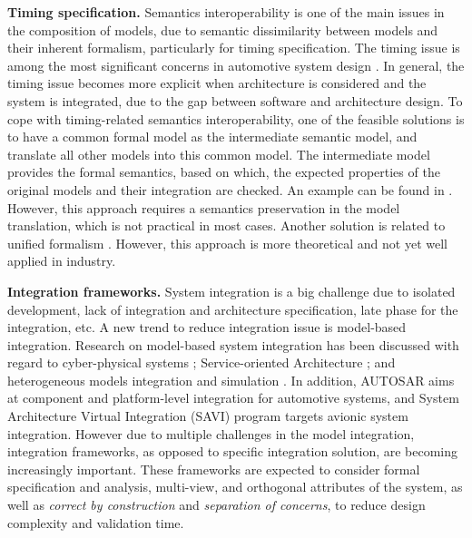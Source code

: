 \vspace{0.6em}
\textbf{Timing specification.}
Semantics interoperability is one of the main issues in the composition of models, due to semantic dissimilarity between models and their inherent formalism, particularly for timing specification. The timing issue is among the most significant concerns in automotive system design \cite{broy06, yu:2013-jsa}. In general, the timing issue becomes more explicit when architecture is considered and the system is integrated, due to the gap between software and architecture design. To cope with timing-related semantics interoperability, one of the feasible solutions is to have a common formal model as the intermediate semantic model, and translate all other models into this common model. The intermediate model provides the formal semantics, based on which, the  expected properties of the original models and their integration are checked. An example can be found in \cite{YU:2011:INRIA-00536907:1}. However, this approach requires a semantics preservation in the model translation, which is not practical in most cases. Another solution is related to unified formalism 
\cite{mathaikutty:2005-fdl, lee:2006-cadics}. 
However, this approach is more theoretical and not yet well applied in industry.

\vspace{0.6em}
\textbf{Integration frameworks.}
System integration is a big challenge due to isolated development, lack of integration and architecture specification, late phase for the integration, etc. A new trend to reduce integration issue is model-based integration. Research on model-based system integration has been discussed with regard to cyber-physical systems \cite{sztipanovits:2012-pieee}; Service-oriented Architecture \cite{rossignol:2013-chap}; and heterogeneous models integration and simulation \cite{eker:2003-pieee}. In addition, AUTOSAR\cite{AUTOSAR} aims at component and platform-level integration for automotive systems, and System Architecture Virtual Integration (SAVI) program \cite{feiler09} targets avionic system integration. 
However due to multiple challenges in the model integration, integration frameworks, as opposed to specific integration solution, are becoming increasingly important. These frameworks are expected to consider formal specification and analysis, multi-view, and orthogonal attributes of the system, as well as \textit{correct by construction} and \textit{separation of concerns}, to reduce design complexity and validation time. 


